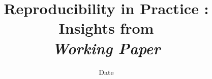 


\title{Reproducibility in Practice : Insights from  \bigskip\\
\textit{Working Paper}
}
\author{}
\date{Date}


\maketitle

\begin{abstract}

\end{abstract}






















